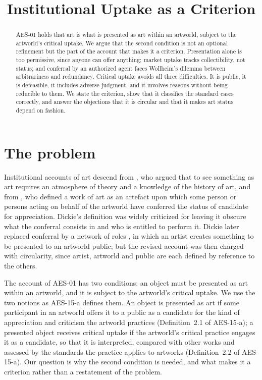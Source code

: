 \documentclass{situationist-preprint}
\title{Institutional Uptake as a Criterion}
\begin{document}
\maketitle

\begin{abstract}
AES-01 holds that art is what is presented as art within an artworld, subject to the artworld's critical uptake. We argue that the second condition is not an optional refinement but the part of the account that makes it a criterion. Presentation alone is too permissive, since anyone can offer anything; market uptake tracks collectibility, not status; and conferral by an authorized agent faces Wollheim's dilemma between arbitrariness and redundancy. Critical uptake avoids all three difficulties. It is public, it is defeasible, it includes adverse judgment, and it involves reasons without being reducible to them. We state the criterion, show that it classifies the standard cases correctly, and answer the objections that it is circular and that it makes art status depend on fashion.
\end{abstract}

\section{The problem}

Institutional accounts of art descend from \citet{Danto1964}, who argued that to see something as art requires an atmosphere of theory and a knowledge of the history of art, and from \citet{Dickie1974}, who defined a work of art as an artefact upon which some person or persons acting on behalf of the artworld have conferred the status of candidate for appreciation. Dickie's definition was widely criticized for leaving it obscure what the conferral consists in and who is entitled to perform it. Dickie later replaced conferral by a network of roles \citep{Dickie1984}, in which an artist creates something to be presented to an artworld public; but the revised account was then charged with circularity, since artist, artworld and public are each defined by reference to the others.

The account of AES-01 has two conditions: an object must be presented as art within an artworld, and it is subject to the artworld's critical uptake. We use the two notions as AES-15-a defines them. An object is presented as art if some participant in an artworld offers it to a public as a candidate for the kind of appreciation and criticism the artworld practices (Definition~2.1 of AES-15-a); a presented object receives critical uptake if the artworld's critical practice engages it as a candidate, so that it is interpreted, compared with other works and assessed by the standards the practice applies to artworks (Definition~2.2 of AES-15-a). Our question is why the second condition is needed, and what makes it a criterion rather than a restatement of the problem.
\end{document}
